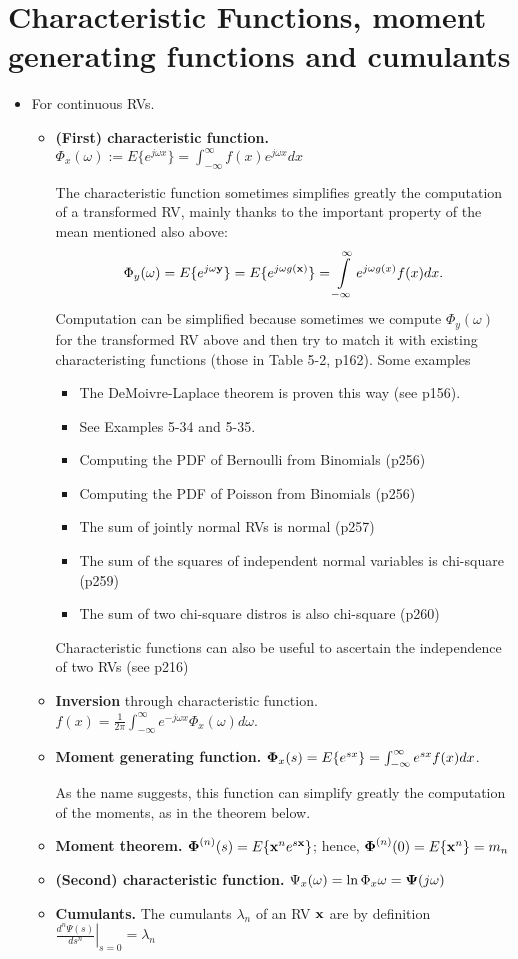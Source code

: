 \documentclass[a4paper, oneside]{book}
\begin{document}
\section{Characteristic Functions, moment generating functions and cumulants}
\begin{itemize}
\item For continuous RVs.
	\begin{itemize}
	\item \textbf{(First) characteristic function.} $\Phi_x(\omega) := E\{e^{j\omega x}\} = \int_{-\infty}^{\infty} f(x) e^{j \omega x}dx$
	
	The characteristic function sometimes simplifies greatly the computation of a transformed RV, mainly thanks to the important property of the mean mentioned also above: %
	 $$\Phi_y(\omega) = E\{e^{j\omega \mathbf y}\} = E\{e^{j\omega g(\mathbf x)}\} = \int\limits_{-\infty}^{\infty} e^{j\omega g(x)} f(x) dx.$$ 
	Computation can be simplified because sometimes we compute $\Phi_y(\omega)$ for the transformed RV above and then try to match it with existing characteristing functions (\eg those in Table 5-2, p162). Some examples
	\begin{itemize}
	\item The DeMoivre-Laplace theorem is proven this way (see p156). 
	\item See Examples 5-34 and 5-35.
	\item Computing the PDF of Bernoulli from Binomials (p256)
	\item Computing the PDF of Poisson from Binomials (p256)
	\item The sum of jointly normal RVs is normal (p257)
	\item The sum of the squares of independent normal variables is chi-square (p259)
	\item The sum of two chi-square distros is also chi-square (p260)
\end{itemize}	 
	Characteristic functions can also be useful to ascertain the independence of two RVs (see p216)
	\item \textbf{Inversion} through characteristic function. $f(x) = \frac{1}{2\pi} \int_{-\infty}^\infty e^{-j\omega x} \Phi_x(\omega) d\omega$.
	\item \textbf{Moment generating function.} $\boldsymbol \Phi_x(s) = E\{e^{sx}\} = \int_{-\infty}^{\infty} e^{s x} f(x)dx$.
	
	As the name suggests, this function can simplify greatly the computation of the moments, as in the theorem below.
	\item \textbf{Moment theorem.} $\boldsymbol \Phi^{(n)}(s) = E\{\mathbf x^n e^{s \mathbf x}\}$; hence, $\boldsymbol \Phi^{(n)}(0)=E\{\mathbf x^n\} = m_n$
	\item \textbf{(Second) characteristic function.} $\Psi_x(\omega) = \ln \Phi_x{\omega} = \boldsymbol \Psi (j\omega)$
	\item \textbf{Cumulants.} The cumulants $\lambda_n$ of an RV $\mathbf x$ are by definition $\left.\frac{d^n\Psi(s)}{d s^n}\right|_{s=0}=\lambda_n$
	

\end{itemize}
\end{itemize}
\end{document}
